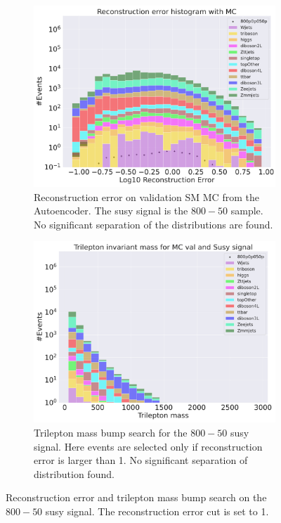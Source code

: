 \begin{figure}[h!]
    \centering
    \begin{subfigure}{.8\textwidth}
        \includegraphics[width=\textwidth]{Figures/AE_testing/b_data_recon_big_rm3_feats_sig_800p0p050p.pdf}
        \caption{Reconstruction error on validation SM MC from the Autoencoder. The susy signal is the $800-50$ sample. 
        No significant separation of the distributions are found. }
        \label{fig:ae_susy_800_50_recon}
    \end{subfigure}
    \hfill
    \begin{subfigure}{.8\textwidth}
        \includegraphics[width=\textwidth]{Figures/AE_testing/b_data_recon_big_rm3_feats_sig_800p0p050p_Trilepton mass.pdf}
        \caption{Trilepton mass bump search for the $800-50$ susy signal. Here events are selected only if reconstruction error is larger than 1. No significant 
        separation of distribution found.}
        \label{fig:ae_susy_800_50_trilep}
    \end{subfigure} 
    \hfill        
    \caption{Reconstruction error and trilepton mass bump search on the $800-50$ susy signal. The reconstruction error cut is set to 1. }
    \label{fig:ae_susy_800_50_recon_trilep}
\end{figure}


